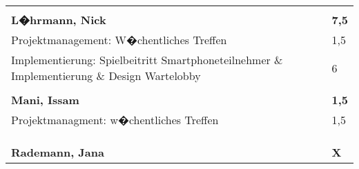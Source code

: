 \documentclass[a4paper,11pt]{scrartcl}
\begin{document}
\begin{longtable}{| p{13.8cm} | C{2.4cm} |}

	&

	\\
	\hline


	&

	\\
	\hline
	\hline


	\textbf{L�hrmann, Nick} & \textbf{7,5}\\ %
	\hline

	Projektmanagement: W�chentliches Treffen
	&
	1,5
	\\
	\hline

	Implementierung: Spielbeitritt Smartphoneteilnehmer \& Implementierung \& Design Wartelobby
	&
  6
	\\
	\hline


	&

	\\
	\hline
	\hline


	\textbf{Mani, Issam} & \textbf{1,5}\\ %
	\hline

  Projektmanagment: w�chentliches Treffen
	&
  1,5
	\\
	\hline


	&

	\\
	\hline


	&

	\\
	\hline


	&

	\\
	\hline
	\hline


	\textbf{Rademann, Jana} & \textbf{X}\\ %
	\hline



\end{longtable}
\end{document}
